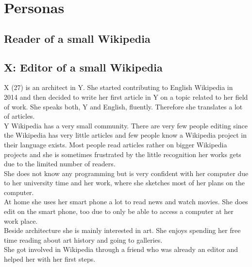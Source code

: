 \section{Personas}

\subsection{Reader of a small Wikipedia}

\subsection{X: Editor of a small Wikipedia}
X (27) is an architect in Y. She started contributing to English Wikipedia in 2014 and then decided to write her first article in Y on a topic related to her field of work. She speaks both, Y and English, fluently. Therefore she translates a lot of articles. \\
Y Wikipedia has a very small community. There are very few people editing since the Wikipedia has very little articles and few people know a Wikipedia project in their language exists. Most people read articles rather on bigger Wikipedia projects and she is sometimes frustrated by the little recognition her works gets due to the limited number of readers. \\
She does not know any programming but is very confident with her computer due to her university time and her work, where she sketches most of her plans on the computer. \\
At home she uses her smart phone a lot to read news and watch movies. She does edit on the smart phone, too due to only be able to access a computer at her work place. \\  
Beside architecture she is mainly interested in art. She enjoys spending her free time reading about art history and going to galleries. \\
She got involved in Wikipedia through a friend who was already an editor and helped her with her first steps.


